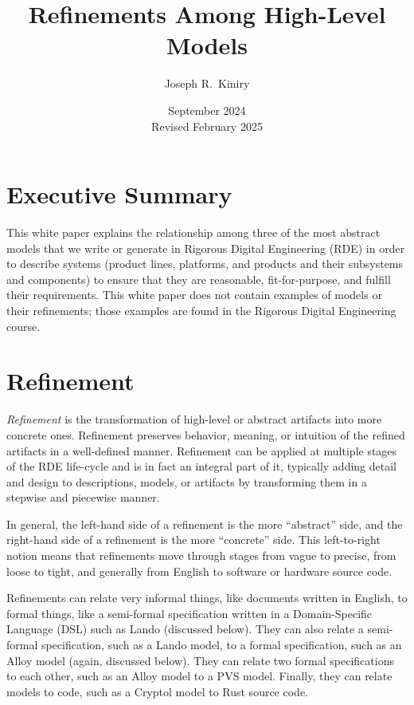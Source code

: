 \documentclass[10pt,letterpaper]{article}
\begin{document}
\title{Refinements Among High-Level Models}
\author{Joseph R.~Kiniry}
\date{September 2024 \\ Revised February 2025}

\maketitle

\section{Executive Summary}
\label{executive-summary}

This white paper explains the relationship among three of the most abstract models that we write or generate in Rigorous Digital Engineering (RDE) in order to describe systems (product lines, platforms, and products and their subsystems and components) to ensure that they are reasonable, fit-for-purpose, and fulfill their requirements. This white paper does not contain examples of models or their refinements; those examples are found in the Rigorous Digital Engineering course.

\section{Refinement}
\label{refinement}
\emph{Refinement} is the transformation of high-level or abstract artifacts into more concrete ones.  Refinement preserves behavior, meaning, or intuition of the refined artifacts in a well-defined manner.  Refinement can be applied at multiple stages of the RDE life-cycle and is in fact an integral part of it, typically adding detail and design to descriptions, models, or artifacts by transforming them in a stepwise and piecewise manner.

In general, the left-hand side of a refinement is the more ``abstract'' side, and the right-hand side of a refinement is the more ``concrete'' side.  This left-to-right notion means that refinements move through stages from vague to precise, from loose to tight, and generally from English to software or hardware source code.

Refinements can relate very informal things, like documents written in English, to formal things, like a semi-formal specification written in a Domain-Specific Language (DSL) such as Lando (discussed below).  They can also relate a semi-formal specification, such as a Lando model, to a formal specification, such as  an Alloy model (again, discussed below). They can relate two formal specifications to each other, such as an Alloy model to a PVS model.  Finally, they can relate models to code, such as a Cryptol model to Rust source code.
\end{document}
